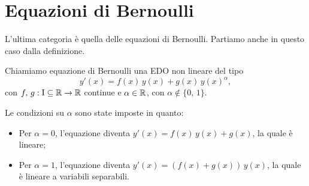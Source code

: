 \documentclass[../../analisi2]{subfiles}
\begin{document}
        \section{Equazioni di Bernoulli}

            L'ultima categoria è quella delle equazioni di Bernoulli. Partiamo anche in questo caso dalla definizione.

            \begin{definizione}
                Chiamiamo equazione di Bernoulli una EDO non lineare del tipo
                \[
                    y'(x) = f(x) \, y(x) + g(x) \, y(x)^\alpha,
                \]
                con \(f, \, g : \mathrm{I} \subseteq \mathbb{R} \to \mathbb{R}\) continue e \(\alpha \in \mathbb{R}\), con \(\alpha \notin \{0, \, 1\}\).
            \end{definizione}

            Le condizioni su \(\alpha\) sono state imposte in quanto:
            \begin{itemize}
                \item Per \(\alpha = 0\), l'equazione diventa \(y'(x) = f(x) \, y(x) + g(x)\), la quale è lineare;
                \item Per \(\alpha = 1\), l'equazione diventa \(y'(x) = \left(f(x) + g(x)\right) \, y(x)\), la quale è lineare a variabili
                    separabili.
            \end{itemize}
\end{document}
